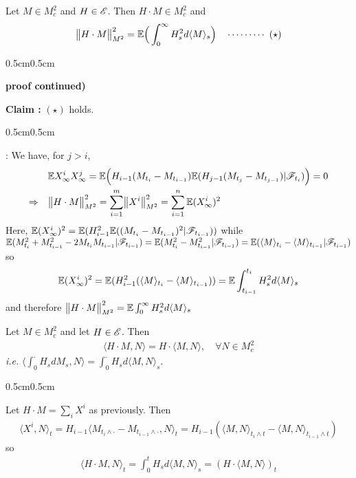 \documentclass[12pt,a4paper]{article}
\newenvironment{proof}
{\begin{changemargin}{0.5cm}{0.5cm} 
	}%
	{\end{changemargin}
}
\newenvironment{subproof}
{\begin{changemargin}{0.5cm}{0.5cm} 
	}%
	{\end{changemargin}
}
\newenvironment{p}
{\begin{proof} 
	}%
	{\end{proof}
}
\begin{document}
\prop Let $M\in M_c^2$ and $H\in \mathscr{E}$. Then $H\cdot M \in M_c^2$ and
\begin{align*}
\bigl\lVert H\cdot M\bigr\rVert_{M^2}^2 = \mathbb{E} \Big( \int_0^{\infty} H_s^2 d\langle M\rangle_s \Big) \quad \cdots\cdots\cdots\,\,(\star)
\end{align*}
\begin{p}
\textbf{proof continued)}

\textbf{Claim :} $(\star)$ holds.
\begin{subproof}
: We have, for $j>i$,
\begin{align*}
& \mathbb{E} X_{\infty}^i X_{\infty}^j = \mathbb{E} \Big(H_{i-1} (M_{t_i}- M_{t_{i-1}})  \mathbb{E} ( H_{j-1} (M_{t_j}- M_{t_{j-1}}) | \mathscr{F}_{t_{i}}) \Big) =0 \\
\Rightarrow \quad &\bigl\lVert H\cdot M\bigr\rVert_{M^2}^2 = \sum_{i=1}^m \bigl\lVert X^i\bigr\rVert_{M^2}^2 = \sum_{i=1}^n \mathbb{E} (X_{\infty}^i)^2
\end{align*}
Here, $\mathbb{E} (X_{\infty}^i)^2 = \mathbb{E}(H_{i-1}^2 \mathbb{E} ( (M_{t_i} - M_{t_{i-1}})^2 | \mathscr{F}_{t_{i-1}} ))$ while $\mathbb{E}(M_{t_i}^2 + M_{t_{i-1}}^2 - 2M_{t_i}M_{t_{i-1}} |\mathscr{F}_{t_{i-1}}) = \mathbb{E}(M_{t_i}^2 - M_{t_{i-1}}^2 | \mathscr{F}_{t_{i-1}}) = \mathbb{E} (\langle M \rangle_{t_i} - \langle M \rangle_{t_{i-1}} |\mathscr{F}_{t_{i-1}} )$ so
\begin{align*}
\mathbb{E} (X_{\infty}^i)^2 = \mathbb{E}(H_{i-1}^2 (\langle M \rangle_{t_i} - \langle M \rangle_{t_{i-1}}) ) = \mathbb{E} \int_{t_{i-1}}^{t_i} H_s^2 d\langle M \rangle_s
\end{align*}
and therefore $\bigl\lVert H\cdot M\bigr\rVert_{M^2}^2 = \mathbb{E} \int_0^{\infty} H_s^2 d\langle M \rangle_s$
\end{subproof}
\eop
\end{p}
\s

\prop Let $M\in M_c^2$ and let $H\in \mathscr{E}$. Then
\begin{align*}
\langle H\cdot M, N \rangle = H \cdot \langle M, N \rangle, \quad \forall N \in M_c^2
\end{align*}
\textit{i.e.} $\langle \int_0^{\cdot} H_s dM_s, N\rangle = \int_0^{\cdot} H_s d\langle M, N \rangle_s$.
\begin{p}
\pf Let $H\cdot M =\sum_i X^i$ as previously. Then
\begin{align*}
\langle X^i, N \rangle_t = H_{i-1} \langle M_{t_i \wedge \cdot} - M_{t_{i-1}\wedge \cdot}, N \rangle_t = H_{i-1} (\langle M, N \rangle_{t_i \wedge t} - \langle M, N\rangle_{t_{i-1}\wedge t})
\end{align*}
so
\begin{align*}
\langle H\cdot M, N \rangle_t = \int_0^t H_s d\langle M, N \rangle_s = (H\cdot \langle M, N \rangle)_t
\end{align*}
\eop
\end{p}
\end{document}
